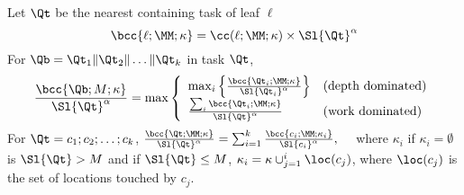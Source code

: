 {\begin{definition}
\noindent{} Let $\Qt$ be the nearest containing task of
leaf $\ell$
\vspace{-4pt}
\[
\bcc{\ell; \MM; \kappa} = \cc(\ell ; \MM; \kappa) \times \Sl{\Qt}^\alpha
\]
\vspace{-4pt}
\noindent{} For $\Qb = \Qt_1\|\Qt_2\|\dots\|\Qt_k$ in task $\Qt$, 
\begin{eqnarray*}
\frac{\bcc{\Qb;M;\kappa}}{\Sl{\Qt}^\alpha} = 
\max\left\{ 
\begin{array}{lll}
 \max_i
\left\{ \frac{\bcc{\Qt_i;\MM;\kappa}}{\Sl{\Qt_i}^\alpha}
\right\}
 & \mbox{(depth dominated)}\\
\frac{\sum_i \bcc{\Qt_i;\MM;\kappa}}{\Sl{\Qt}^\alpha}
 & \mbox{(work dominated)}
\end{array}
\right.
\end{eqnarray*}
\vspace{-4pt}
\noindent{} For $\Qt = c_1;c_2;\dots;c_k$, 
$
\frac{\bcc{\Qt;\MM;\kappa}}{\Sl{\Qt}^\alpha} 
= 
\sum_{i=1}^{k}\frac{\bcc{c_i;\MM;\kappa_i}}{\Sl{c_i}^\alpha},\quad
$
where $\kappa_i$ if $\kappa_i = \emptyset$ is $\Sl{\Qt}>M$ and if
$\Sl{\Qt}\leq M$, $\kappa_i = \kappa \cup_{j=1}^{i} \loc(c_j)$, where
$\loc(c_j)$ is the set of locations touched by $c_j$.
\vspace{-4pt}
\end{definition}
}
